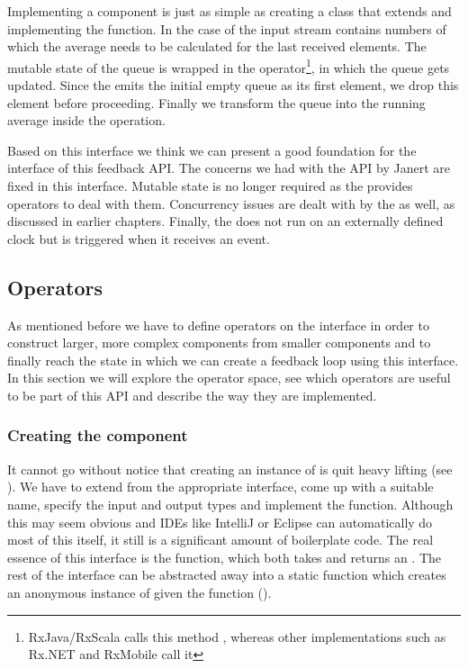 Implementing a component is just as simple as creating a class that extends \comp and implementing the  function. In the case of  the input stream contains numbers of which the average needs to be calculated for the last  received elements. The mutable state of the queue is wrapped in the  operator\footnote{RxJava/RxScala calls this method , whereas other implementations such as Rx.NET and RxMobile call it }, in which the queue gets updated. Since the  emits the initial empty queue as its first element, we drop this element before proceeding. Finally we transform the queue into the running average inside the  operation.

Based on this interface we think we can present a good foundation for the interface of this feedback API. The concerns we had with the API by Janert are fixed in this interface. Mutable state is no longer required as the \obs provides operators to deal with them. Concurrency issues are dealt with by the \obs as well, as discussed in earlier chapters. Finally, the \comp does not run on an externally defined clock but is triggered when it receives an event.

\subsection{Operators}
As mentioned before we have to define operators on the \comp interface in order to construct larger, more complex components from smaller components and to finally reach the state in which we can create a feedback loop using this interface. In this section we will explore the operator space, see which operators are useful to be part of this API and describe the way they are implemented.

\subsubsection{Creating the component}
It cannot go without notice that creating an instance of \comp is quit heavy lifting (see ). We have to extend from the appropriate interface, come up with a suitable name, specify the input and output types and implement the  function. Although this may seem obvious and IDEs like IntelliJ or Eclipse can automatically do most of this itself, it still is a significant amount of boilerplate code. The real essence of this interface is the  function, which both takes and returns an \obs. The rest of the interface can be abstracted away into a static function which creates an anonymous instance of \comp given the  function ().

